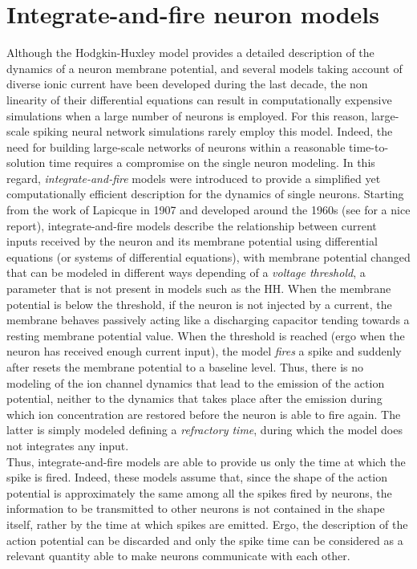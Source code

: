 \documentclass[a4paper, 12pt, twoside, openright]{book}
\begin{document}
\section{Integrate-and-fire neuron models}
Although the Hodgkin-Huxley model provides a detailed description of the dynamics of a neuron membrane potential, and several models taking account of diverse ionic current have been developed during the last decade, the non linearity of their differential equations can result in computationally expensive simulations when a large number of neurons is employed. For this reason, large-scale spiking neural network simulations rarely employ this model. Indeed, the need for building large-scale networks of neurons within a reasonable time-to-solution time requires a compromise on the single neuron modeling. In this regard, \textit{integrate-and-fire} models were introduced to provide a simplified yet computationally efficient description for the dynamics of single neurons. Starting from the work of Lapicque in 1907 \cite{Brunel2007_lapique} and developed around the 1960s (see \cite{Brunel2007} for a nice report), integrate-and-fire models describe the relationship between current inputs received by the neuron and its membrane potential using differential equations (or systems of differential equations), with membrane potential changed that can be modeled in different ways depending of a \textit{voltage threshold}, a parameter that is not present in models such as the HH. When the membrane potential is below the threshold, if the neuron is not injected by a current, the membrane behaves passively acting like a discharging capacitor tending towards a resting membrane potential value. When the threshold is reached (ergo when the neuron has received enough current input), the model \textit{fires} a spike and suddenly after resets the membrane potential to a baseline level. Thus, there is no modeling of the ion channel dynamics that lead to the emission of the action potential, neither to the dynamics that takes place after the emission during which ion concentration are restored before the neuron is able to fire again. The latter is simply modeled defining a \textit{refractory time}, during which the model does not integrates any input.\\
Thus, integrate-and-fire models are able to provide us only the time at which the spike is fired. Indeed, these models assume that, since the shape of the action potential is approximately the same among all the spikes fired by neurons, the information to be transmitted to other neurons is not contained in the shape itself, rather by the time at which spikes are emitted. Ergo, the description of the action potential can be discarded and only the spike time can be considered as a relevant quantity able to make neurons communicate with each other.
\end{document}
